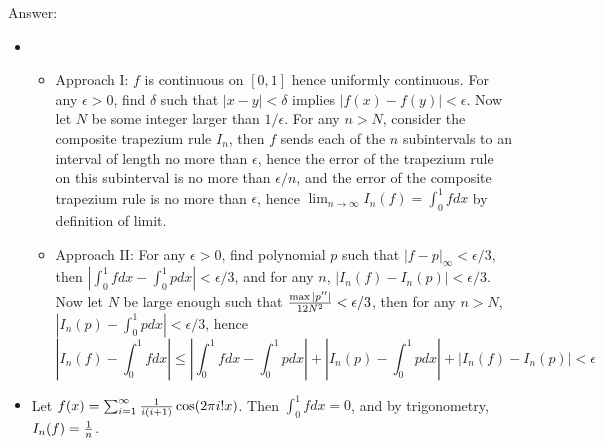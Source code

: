 \documentclass[20pt]{article} %
\theoremstyle{break}
\begin{document}
Answer:
\begin{itemize}
\item \begin{itemize}
    \item Approach I: $f$ is continuous on $[0, 1]$ hence uniformly continuous. For any $\epsilon>0$, find $\delta$ such that $|x-y|<\delta$ implies $|f(x)-f(y)|<\epsilon$. Now let $N$ be some integer larger than $1/\epsilon$. For any $n>N$, consider the composite trapezium rule $I_n$, then $f$ sends each of the $n$ subintervals to an interval of length no more than $\epsilon$, hence the error of the trapezium rule on this subinterval is no more than $\epsilon/n$, and the error of the composite trapezium rule is no more than $\epsilon$, hence $\lim_{n\rightarrow\infty}I_n(f)=\int_0^1fdx$ by definition of limit.
    \item Approach II: For any $\epsilon>0$, find polynomial $p$ such that $|f-p|_\infty<\epsilon/3$, then $|\int_0^1fdx-\int_0^1pdx|<\epsilon/3$, and for any $n$, $|I_n(f)-I_n(p)|<\epsilon/3$. Now let $N$ be large enough such that ${\max|p''|\over 12N^2}<\epsilon/3$, then for any $n>N$, $|I_n(p)-\int_0^1pdx|<\epsilon/3$, hence
      \[|I_n(f)-\int_0^1fdx|\leq |\int_0^1fdx-\int_0^1pdx|+|I_n(p)-\int_0^1pdx|+|I_n(f)-I_n(p)|<\epsilon\]
   \end{itemize}
 \item Let $f(x)=\sum_{i=1}^\infty{1\over i(i+1)}\cos(2\pi i!x)$. Then $\int_0^1fdx=0$, and by trigonometry, $I_n(f)={1\over n}$. 
\end{itemize}
\end{document}
